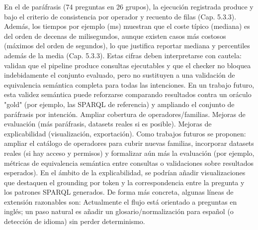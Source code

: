 \markdownRendererUlItem En el  de paráfrasis (74 preguntas en 26 grupos), la ejecución registrada produce  y  bajo el criterio de consistencia por operador y recuento de filas (Cap. 5.3.3).\markdownRendererUlItemEnd 
\markdownRendererUlEndTight \markdownRendererInterblockSeparator
{}Además, los tiempos por ejemplo (ms) muestran que el coste típico (mediana) es del orden de decenas de milisegundos, aunque existen casos más costosos (máximos del orden de segundos), lo que justifica reportar mediana y percentiles además de la media (Cap. 5.3.3).\markdownRendererInterblockSeparator
{}Estas cifras deben interpretarse con cautela: validan que el pipeline produce consultas ejecutables y que el checker no bloquea indebidamente el conjunto evaluado, pero no sustituyen a una validación de equivalencia semántica completa para todas las intenciones. En un trabajo futuro, esta validez semántica puede reforzarse comparando resultados contra un oráculo "gold" (por ejemplo, las SPARQL de referencia) y ampliando el conjunto de paráfrasis por intención.\markdownRendererInterblockSeparator
{}\markdownRendererInterblockSeparator
{}\markdownRendererUlBeginTight
\markdownRendererUlItem Ampliar cobertura de operadores/familias.\markdownRendererUlItemEnd 
\markdownRendererUlItem Mejoras de evaluación (más paráfrasis, datasets reales si es posible).\markdownRendererUlItemEnd 
\markdownRendererUlItem Mejoras de explicabilidad (visualización, exportación).\markdownRendererUlItemEnd 
\markdownRendererUlEndTight \markdownRendererInterblockSeparator
{}Como trabajos futuros se proponen: ampliar el catálogo de operadores para cubrir nuevas familias, incorporar datasets reales (si hay acceso y permisos) y formalizar aún más la evaluación (por ejemplo, métricas de equivalencia semántica entre consultas o validaciones sobre resultados esperados). En el ámbito de la explicabilidad, se podrían añadir visualizaciones que destaquen el grounding por token y la correspondencia entre la pregunta y los patrones SPARQL generados.\markdownRendererInterblockSeparator
{}De forma más concreta, algunas líneas de extensión razonables son:\markdownRendererInterblockSeparator
{}\markdownRendererUlBeginTight
\markdownRendererUlItem {} Actualmente el flujo está orientado a preguntas en inglés; un paso natural es añadir un glosario/normalización para español (o detección de idioma) sin perder determinismo.\markdownRendererUlItemEnd 
